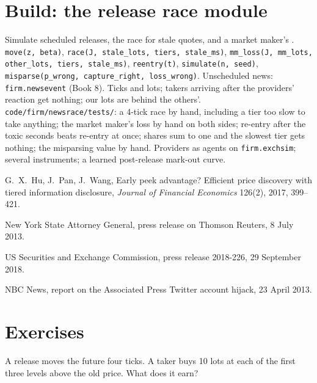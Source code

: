 \section{Build: the release race module}\label{bld:hf:news-and-event-trading:newsrace}

\begin{build}
 Simulate scheduled releases, the race for stale quotes, and a market maker's .
 \texttt{move(z, beta)}, \texttt{race(J, stale\_lots, tiers, stale\_ms)}, \texttt{mm\_loss(J, mm\_lots, other\_lots, tiers,
stale\_ms)}, \texttt{reentry(t)}, \texttt{simulate(n, seed)}, \texttt{misparse(p\_wrong, capture\_right, loss\_wrong)}. Unscheduled news:
\texttt{firm.newsevent} (Book 8).
 Ticks and lots; takers arriving after the providers' reaction get nothing; our lots are behind the others'.
 \texttt{code/firm/newsrace/tests/}: a 4-tick race by hand, including a tier too slow to take anything; the market
maker's loss by hand on both sides; re-entry after the toxic seconds beats re-entry at once; shares sum to one and the slowest tier gets
nothing; the misparsing value by hand.
 Providers as agents on \texttt{firm.exchsim}; several instruments; a learned post-release mark-out curve.
\end{build}

\begin{omsources}
\item G.~X.~Hu, J.~Pan, J.~Wang, Early peek advantage? Efficient price discovery with tiered information disclosure, \emph{Journal of Financial
Economics} 126(2), 2017, 399--421.
\item New York State Attorney General, press release on Thomson Reuters, 8 July 2013.
\item US Securities and Exchange Commission, press release 2018-226, 29 September 2018.
\item NBC News, report on the Associated Press Twitter account hijack, 23 April 2013.
\end{omsources}

\section{Exercises}

\begin{exercise}[$\star$]\label{exo:hf:news-and-event-trading:1}
A release moves the future four ticks. A taker buys 10 lots at each of the first three levels above the old price. What does it earn?
\end{exercise}

